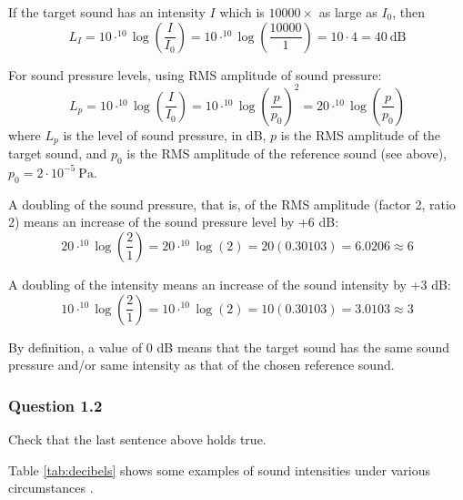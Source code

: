 \documentclass[
]{book}
\begin{document}
If the target sound has an intensity \(I\) which is \(10000\times\) as large as \(I_0\), then
\[L_I = 10 \cdot ^{10}\log \left( \frac{I}{I_0} \right) = 
10 \cdot ^{10}\log \left( \frac{10000}{1} \right) = 
10 \cdot 4 = 40\ \textrm{dB}\]

For sound pressure levels, using RMS amplitude of sound pressure:
\[  L_p = 10 \cdot ^{10}\log \left( \frac{I}{I_0} \right) 
        = 10 \cdot  ^{10}\log \left( \frac{p}{p_0} \right)^2 
        = 20 \cdot  ^{10}\log \left( \frac{p}{p_0} \right) \]
where \(L_p\) is the level of sound pressure, in dB, \(p\) is the RMS amplitude of the target sound, and \(p_0\) is the RMS amplitude of the reference sound (see above), \(p_0 = 2 \cdot 10^{-5}\ \textrm{Pa}\).

A doubling of the sound pressure, that is, of the RMS amplitude (factor 2, ratio 2) means an increase of the sound pressure level by +6 dB:
\[20\cdot ^{10}\log \left( \frac{2}{1} \right) = 20 \cdot ^{10}\log (2) =   20 (0.30103) = 6.0206 \approx 6\]

A doubling of the intensity means an increase of the sound intensity by +3 dB:
\[10\cdot ^{10}\log \left( \frac{2}{1} \right) = 10 \cdot ^{10}\log (2) =   10 (0.30103) = 3.0103 \approx 3\]

By definition, a value of 0 dB means that the target sound has the same sound pressure and/or same intensity as that of the chosen reference sound.

\label{questions-0dB}
\subsubsection*{Question 1.2}\label{question-1.2}

Check that the last sentence above holds true.

Table \ref{tab:decibels} shows some examples of sound intensities under various circumstances \citep[94]{Fry_1979}.
\end{document}
